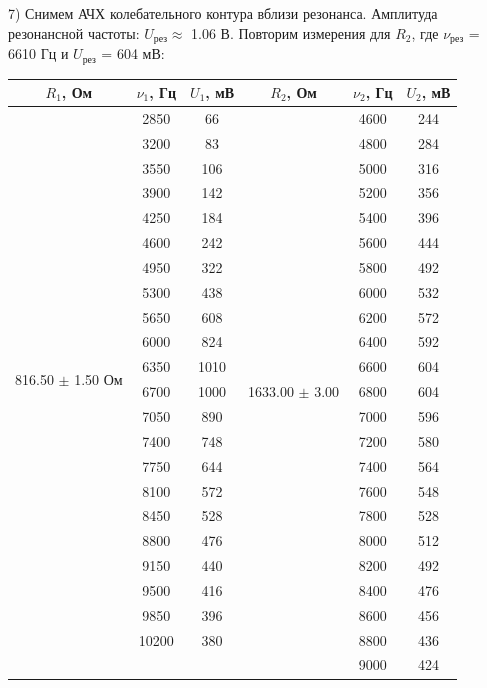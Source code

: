 \documentclass[a4paper,12pt]{article}
\begin{document}
\par 7) Снимем АЧХ колебательного контура вблизи резонанса. Амплитуда резонансной частоты: $U_{\text{рез}} \approx$ 1.06 В. Повторим измерения для $R_2$, где $\nu_{\text{рез}}$ = 6610 Гц  и $U_{\text{рез}}$ = 604 мВ: \\

\begin{center}
\begin{tabular}{|c|c|c|c|c|c|}
	\hline
	$R_1$, Ом & $\nu_1$, Гц & $U_1$, мВ & $R_2$, Ом & $\nu_2$, Гц & $U_2$, мВ \\
	\hline
	\multirow{22}{*}{816.50 $\pm$ 1.50 Ом} & 2850 & 66 & \multirow{23}{*}{1633.00 $\pm$ 3.00} & 4600 & 244 \\
	\cline{2-3} \cline{5-6} & 3200 & 83 & & 4800 & 284 \\
	\cline{2-3} \cline{5-6} & 3550 & 106 & & 5000 & 316 \\
	\cline{2-3} \cline{5-6} & 3900 & 142 & & 5200 & 356 \\
	\cline{2-3} \cline{5-6} & 4250 & 184 & & 5400 & 396 \\
	\cline{2-3} \cline{5-6} & 4600 & 242 & & 5600 & 444 \\
	\cline{2-3} \cline{5-6} & 4950 & 322 & & 5800 & 492 \\
	\cline{2-3} \cline{5-6} & 5300 & 438 & & 6000 & 532 \\
	\cline{2-3} \cline{5-6} & 5650 & 608 & & 6200 & 572 \\
	\cline{2-3} \cline{5-6} & 6000 & 824 & & 6400 & 592 \\
	\cline{2-3} \cline{5-6} & 6350 & 1010 & & 6600 & 604 \\
	\cline{2-3} \cline{5-6} & 6700 & 1000 & & 6800 & 604 \\
	\cline{2-3} \cline{5-6} & 7050 & 890 & & 7000 & 596 \\
	\cline{2-3} \cline{5-6} & 7400 & 748 & & 7200 & 580 \\
	\cline{2-3} \cline{5-6} & 7750 & 644 & & 7400 & 564 \\
	\cline{2-3} \cline{5-6} & 8100 & 572 & & 7600 & 548 \\
	\cline{2-3} \cline{5-6} & 8450 & 528 & & 7800 & 528 \\
	\cline{2-3} \cline{5-6} & 8800 & 476 & & 8000 & 512 \\
	\cline{2-3} \cline{5-6} & 9150 & 440 & & 8200 & 492 \\
	\cline{2-3} \cline{5-6} & 9500 & 416 & & 8400 & 476 \\
	\cline{2-3} \cline{5-6} & 9850 & 396 & & 8600 & 456 \\
	\cline{2-3} \cline{5-6} & 10200 & 380 & & 8800 & 436 \\
	\cline{2-3} \cline{5-6} & & & & 9000 & 424 \\
	\hline
\end{tabular}
\end{center}
\end{document}
